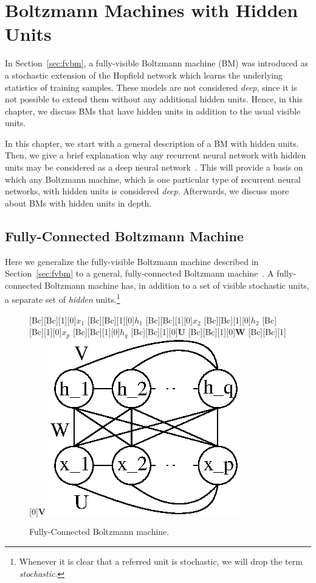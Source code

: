 \documentclass{now}
\newcommand{\matr}[1]{\mathbf{#1}}
\newcommand{\mW}[0]{\matr{W}}
\newcommand{\mU}[0]{\matr{U}}
\newcommand{\mV}[0]{\matr{V}}
\begin{document}
\chapter{Boltzmann Machines with Hidden Units}
\label{chap:bm}

In Section~\ref{sec:fvbm}, a fully-visible Boltzmann machine
(BM) was introduced as a stochastic
extension of the Hopfield network which learns the underlying statistics of
training samples. These models are not considered \textit{deep}, since it is not
possible to extend them without any additional hidden units. Hence, in this
chapter, we discuss BMs that have hidden units in addition to the usual visible
units.

In this chapter, we start with a general description of a BM with hidden units.
Then, we give  a brief explanation why any recurrent neural network with hidden
units may be considered as a deep neural network~\citep[see,
e.g.,][]{Bengio2013rec}. This will provide a basis on which any Boltzmann
machine, which is one particular type of recurrent neural networks, with hidden
units is considered \textit{deep}. Afterwards, we discuss more about BMs with
hidden units in depth.

\section{Fully-Connected Boltzmann Machine}
\label{sec:fbm}

Here we generalize the fully-visible Boltzmann machine described in
Section~\ref{sec:fvbm} to a general, fully-connected Boltzmann
machine~\citep{Ackley1985}.  A fully-connected Boltzmann machine has, in
addition to a set of visible stochastic units, a separate set of \textit{hidden}
units.\footnote{
    Whenever it is clear that a referred unit is stochastic, we will drop the
    term \textit{stochastic}.
} 

\begin{figure}
    \centering
    [Bc][Bc][1][0]{$x_1$}
    [Bc][Bc][1][0]{$h_1$}
    [Bc][Bc][1][0]{$x_2$}
    [Bc][Bc][1][0]{$h_2$}
    [Bc][Bc][1][0]{$x_p$}
    [Bc][Bc][1][0]{$h_q$}
    [Bc][Bc][1][0]{$\mU$}
    [Bc][Bc][1][0]{$\mW$}
    [Bc][Bc][1][0]{$\mV$}
    \includegraphics[width=0.4\columnwidth]{../figures/fbm.eps}
    \caption{Fully-Connected Boltzmann machine.}
    \label{fig:fbm}
\end{figure}
\end{document}
